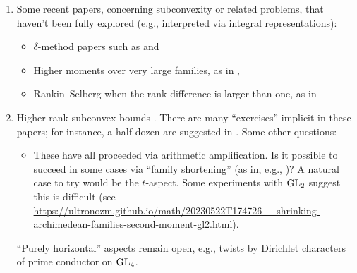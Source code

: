 \documentclass[reqno]{amsart} 
\begin{document}
\begin{enumerate}
\item Some recent papers, concerning subconvexity or related problems, that haven't been fully explored (e.g., interpreted via integral representations):
  \begin{itemize}
  \item $\delta$-method papers such as \cite{MR4416133} and \cite{2022arXiv2206.06517}
  \item Higher moments over very large families, as in \cite{MR4216694}, \cite{MR4067357}
  \item Rankin--Selberg when the rank difference is larger than one, as in \cite{MR3996341}
  \end{itemize}

\item Higher rank subconvex bounds \cite{MR4203038, 2023arXiv2309.16667, 2020arXiv201202187N, 2021arXiv210915230N, 2023arXiv2309.06314}.  There are many ``exercises'' implicit in these papers; for instance, a half-dozen are suggested in \cite[Remark 1.4]{2020arXiv201202187N}.  Some other questions:
  \begin{itemize}
  \item These have all proceeded via arithmetic amplification.  Is it possible to succeed in some cases via ``family shortening'' (as in, e.g., \cite{Sar01})?  A natural case to try would be the $t$-aspect.  Some experiments with $\operatorname{GL}_2$ suggest this is difficult (see \url{https://ultronozm.github.io/math/20230522T174726__shrinking-archimedean-families-second-moment-gl2.html}).
  \end{itemize} ``Purely horizontal'' aspects remain open, e.g., twists by Dirichlet characters of prime conductor on $\operatorname{GL}_4$.
\end{enumerate}


{} 
\end{document}
